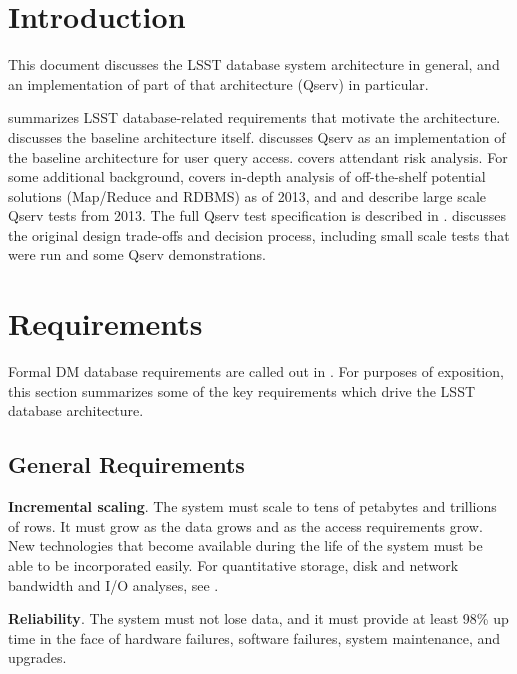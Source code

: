 \documentclass[DM,toc]{lsstdoc}
\begin{document}
\section{Introduction}\label{introduction}

This document discusses the LSST database system architecture in general,
and an implementation of part of that architecture (Qserv) in particular.

 summarizes LSST database-related requirements that
motivate the architecture.  discusses the
baseline architecture itself.  discusses Qserv as an
implementation of the baseline architecture for user query access.
 covers attendant risk analysis. For some additional
background,  covers in-depth analysis of off-the-shelf
potential solutions (Map/Reduce and RDBMS) as of 2013, and 
and  describe large scale Qserv tests from 2013. The full
Qserv test specification is described in . 
discusses the original design trade-offs and decision process, including small
scale tests that were run and some Qserv demonstrations.

\section{Requirements}\label{requirements}

Formal DM database requirements are called out in .
For purposes of exposition, this section summarizes some of the
key requirements which drive the LSST database architecture.

\subsection{General Requirements}\label{general-requirements}

\textbf{Incremental scaling}. The system must scale to tens of petabytes and
trillions of rows. It must grow as the data grows and as the access
requirements grow. New technologies that become available during the life of
the system must be able to be incorporated easily. For quantitative storage,
disk and network bandwidth and I/O analyses, see .

\textbf{Reliability}. The system must not lose data, and it must provide
at least 98\% up time in the face of hardware failures, software
failures, system maintenance, and upgrades.
\end{document}
